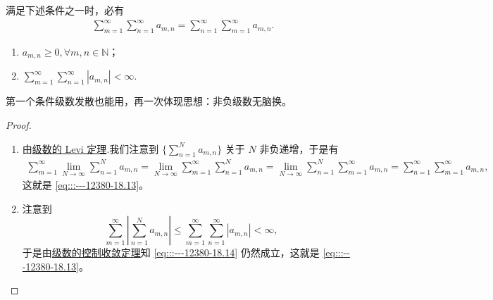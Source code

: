 \documentclass[../../main.tex]{subfiles}
\begin{document}
\begin{theorem}[级数的Fubini定理]\label{theorem:级数的Fubini定理}
满足下述条件之一时，必有
\begin{align}
\sum_{m = 1}^{\infty} \sum_{n = 1}^{\infty} a_{m,n} = \sum_{n = 1}^{\infty} \sum_{m = 1}^{\infty} a_{m,n}. \label{eq:::---12380-18.13}
\end{align}
\begin{enumerate}
\item \( a_{m,n} \geqslant 0, 
\forall m, n \in \mathbb{N} \)；

\item $\sum_{m = 1}^{\infty} \sum_{n = 1}^{\infty} |a_{m,n}| < \infty.$
\end{enumerate}
\end{theorem}
\begin{note}
第一个条件级数发散也能用，再一次体现思想：非负级数无脑换。
\end{note}
\begin{proof}
\begin{enumerate}
\item 由\hyperref[theorem:级数的Levi定理]{级数的 Levi 定理}.我们注意到 \( \{\sum_{n = 1}^{N} a_{m,n} \}\) 关于 \( N \) 非负递增，于是有
\begin{align}
\sum_{m = 1}^{\infty} \lim_{N \to \infty} \sum_{n = 1}^{N} a_{m,n} = \lim_{N \to \infty} \sum_{m = 1}^{\infty} \sum_{n = 1}^{N} a_{m,n} = \lim_{N \to \infty} \sum_{n = 1}^{N} \sum_{m = 1}^{\infty} a_{m,n} = \sum_{n = 1}^{\infty} \sum_{m = 1}^{\infty} a_{m,n}, \label{eq:::---12380-18.14}
\end{align}
这就是 \eqref{eq:::---12380-18.13}。

\item 注意到
\[
\sum_{m = 1}^{\infty} \left| \sum_{n = 1}^{N} a_{m,n} \right| \leqslant \sum_{m = 1}^{\infty} \sum_{n = 1}^{\infty} |a_{m,n}| < \infty,
\]
于是由\hyperref[theorem:级数的控制收敛定理]{级数的控制收敛定理}知 \eqref{eq:::---12380-18.14} 仍然成立，这就是 \eqref{eq:::---12380-18.13}。
\end{enumerate}

\end{proof}
\end{document}
